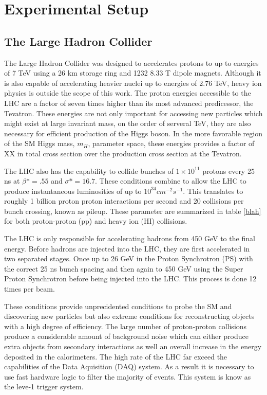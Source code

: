 \chapter{Experimental Setup}
\label{sec:ExpSetup}


\section{The Large Hadron Collider}
\label{sec:LHC}
The Large Hadron Collider was designed to accelerates protons to up to 
energies of 7 TeV using a 26 km storage ring and  1232  8.33 T dipole magnets. 
Although it is also capable of accelerating heavier nuclei up to energies of 
2.76 TeV, heavy ion physics is outside the scope of this work.  The proton
energies accessible to the LHC are a factor of seven times higher than its
most advanced predicessor, the Tevatron.  These energies are not only 
important for accessing new particles which might exist at large invariant
mass, on the order of serveral TeV, they are also necessary for efficient 
production of the Higgs boson.  In the more favorable region of the SM 
Higgs mass,  $m_{H}$, parameter space, these energies provides a 
factor of XX in total cross section over the production cross section at
the Tevatron.  

The LHC also has the capability to collide bunches of $1\times10^11$
protons every 25 ns at $\beta*=.55$ and $\sigma*=16.7$.  These 
conditions combine to allow the LHC to produce instantaneous luminosities 
of up to $10^34 cm^{-2}s^{-1}$.  This translates to roughly 1 billion proton
proton interactions per second and 20 collisions per bunch crossing, known
as pileup.  These
parameter are summarized in table \ref{blah} for both proton-proton (pp)
and heavy ion (HI) collisions. 

The LHC is only responsible for accelerating hadrons from 450 GeV to the 
final energy.  Before hadrons are injected into the LHC, they are first 
accelerated in two separated stages.  Once up to 26 GeV in the Proton
Synchrotron (PS) with the correct 25 ns bunch spacing and then again
to 450 GeV using  the Super Proton Synchrotron before being injected 
into the LHC.  This process is done 12 times per beam.  

These conditions provide unprecidented conditions to probe the SM and 
discovering new particles but also extreme conditions for reconstructing
objects with a high degree of efficiency.  The large number of proton-proton
collisions produce a considerable amount of background noise which can 
either produce extra objects from secondary interactions as well an overall
increase in the energy deposited in the calorimeters.  The  high rate of the 
LHC far exceed the capabilities of the Data Aquisition (DAQ) system.  As a 
result it is necessary to use fast hardware logic to filter the majority of events. 
This system is know as the leve-1 trigger system.  


